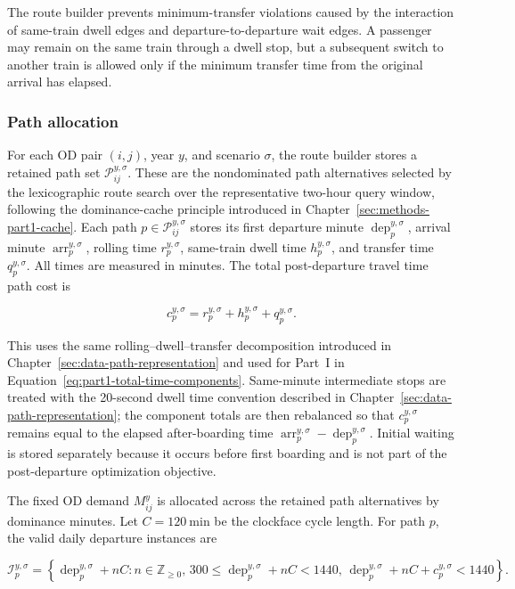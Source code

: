 \documentclass[preprint,12pt]{elsarticle}
\begin{document}
The route builder prevents minimum-transfer violations caused by the interaction of same-train dwell edges and departure-to-departure wait edges. A passenger may remain on the same train through a dwell stop, but a subsequent switch to another train is allowed only if the minimum transfer time from the original arrival has elapsed.

\subsubsection{Path allocation}\label{sec:methods-part2-path-allocation}
For each OD pair \((i,j)\), year \(y\), and scenario \(\sigma\), the route builder stores a retained path set \(\mathcal{P}_{ij}^{y,\sigma}\). These are the nondominated path alternatives selected by the lexicographic route search over the representative two-hour query window, following the dominance-cache principle introduced in Chapter~\ref{sec:methods-part1-cache}. Each path \(p\in\mathcal{P}_{ij}^{y,\sigma}\) stores its first departure minute \(\operatorname{dep}_p^{y,\sigma}\), arrival minute \(\operatorname{arr}_p^{y,\sigma}\), rolling time \(r_p^{y,\sigma}\), same-train dwell time \(h_p^{y,\sigma}\), and transfer time \(q_p^{y,\sigma}\). All times are measured in minutes.
The total post-departure travel time path cost is

\begin{equation}
c_p^{y,\sigma}
=
r_p^{y,\sigma}
+
h_p^{y,\sigma}
+
q_p^{y,\sigma}.
\label{eq:part2-path-cost}
\end{equation}

This uses the same rolling--dwell--transfer decomposition introduced in Chapter~\ref{sec:data-path-representation} and used for Part~I in Equation~\ref{eq:part1-total-time-components}. Same-minute intermediate stops are treated with the 20-second dwell time convention described in Chapter~\ref{sec:data-path-representation}; the component totals are then rebalanced so that \(c_p^{y,\sigma}\) remains equal to the elapsed after-boarding time \(\operatorname{arr}_p^{y,\sigma}-\operatorname{dep}_p^{y,\sigma}\). Initial waiting is stored separately because it occurs before first boarding and is not part of the post-departure optimization objective.

The fixed OD demand \(M_{ij}^y\) is allocated across the retained path alternatives by dominance minutes. Let \(C=120\ \mathrm{min}\) be the clockface cycle length. For path \(p\), the valid daily departure instances are


\begin{equation}
\mathcal{I}_p^{y,\sigma}
=
\left\{
\operatorname{dep}_p^{y,\sigma}+nC:
n\in\mathbb{Z}_{\ge0},\,
300\le \operatorname{dep}_p^{y,\sigma}+nC<1440,\,
\operatorname{dep}_p^{y,\sigma}+nC+c_p^{y,\sigma}<1440
\right\}.
\label{eq:part2-daily-repetitions}
\end{equation}
\end{document}
